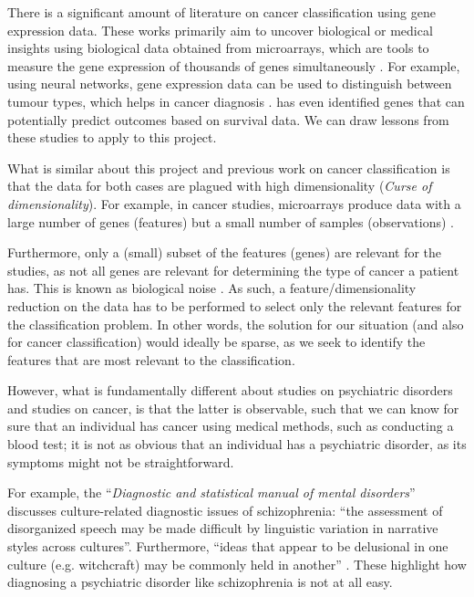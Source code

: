 \documentclass[12pt, twoside, a4paper]{report}
\begin{document}
There is a significant amount of literature on cancer classification using gene expression data. These works primarily aim to uncover biological or medical insights using biological data obtained from microarrays, which are tools to measure the gene expression of thousands of genes simultaneously \citep{RefWorks:79}. For example, using neural networks, gene expression data can be used to distinguish between tumour types, which helps in cancer diagnosis \citep{RefWorks:80, RefWorks:88}. \cite{RefWorks:196} has even identified genes that can potentially predict outcomes based on survival data. We can draw lessons from these studies to apply to this project.

What is similar about this project and previous work on cancer classification is that the data for both cases are plagued with high dimensionality (\textit{Curse of dimensionality}). For example, in cancer studies, microarrays produce data with a large number of genes (features) but a small number of samples (observations) \cite{RefWorks:88}.

Furthermore, only a (small) subset of the features (genes) are relevant for the studies, as not all genes are relevant for determining the type of cancer a patient has. This is known as biological noise \cite{RefWorks:89}. As such, a feature/dimensionality reduction on the data has to be performed to select only the relevant features for the classification problem. In other words, the solution for our situation (and also for cancer classification) would ideally be sparse, as we seek to identify the features that are most relevant to the classification.

However, what is fundamentally different about studies on psychiatric disorders and studies on cancer, is that the latter is observable, such that we can know for sure that an individual has cancer using medical methods, such as conducting a blood test; it is not as obvious that an individual has a psychiatric disorder, as its symptoms might not be straightforward.

For example, the ``\textit{Diagnostic and statistical manual of mental disorders}'' discusses culture-related diagnostic issues of schizophrenia: ``the assessment of disorganized speech may be made difficult by linguistic variation in narrative styles across cultures''. Furthermore, ``ideas that appear to be delusional in one culture (e.g. witchcraft) may be commonly held in another'' \cite{RefWorks:114}. These highlight how diagnosing a psychiatric disorder like schizophrenia is not at all easy.
\end{document}
